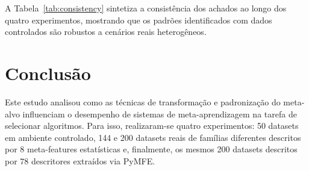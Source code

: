 \documentclass[12pt]{article}
\begin{document}
A Tabela~\ref{tab:consistency} sintetiza a consistência dos achados ao longo dos quatro experimentos, mostrando que os padrões identificados com dados controlados são robustos a cenários reais heterogêneos.

\begin{table}[H]
\centering
\caption{Consistência dos achados ao longo dos quatro experimentos.}
\label{tab:consistency}
%
\end{table}

\section{Conclusão}

Este estudo analisou como as técnicas de transformação e padronização do meta-alvo influenciam o desempenho de sistemas de meta-aprendizagem na tarefa de selecionar algoritmos. Para isso, realizaram-se quatro experimentos: 50 datasets em ambiente controlado, 144 e 200 datasets reais de famílias diferentes descritos por 8 meta-features estatísticas e, finalmente, os mesmos 200 datasets descritos por 78 descritores extraídos via PyMFE.
\end{document}
